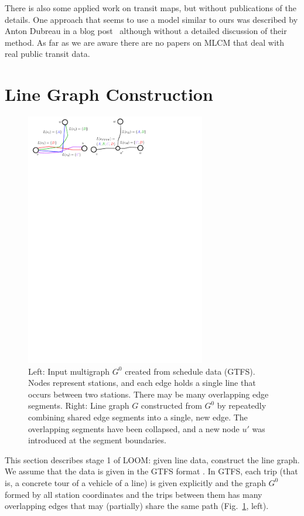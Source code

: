 \documentclass[format=acmsmall, review=false, screen=true]{acmart}
\begin{document}
There is also some applied work on transit maps, but without publications of the details.
One approach that seems to use a model similar to ours was described by Anton Dubreau in a blog post~\cite{dub16} although without a detailed discussion of their method. As far as we are aware there are no papers on MLCM that deal with real public transit data.

%
\section{Line Graph Construction}\label{SEC:graph}
%
\begin{figure}[t]
  \centering
  \includegraphics[width=0.7\textwidth]{linegraph.pdf}
  \caption{Left: Input multigraph $G^0$ created from schedule data (GTFS). Nodes represent stations, and each edge holds a single line that occurs between two stations. There may be many overlapping edge segments. Right: Line graph $G$ constructed from $G^0$ by repeatedly combining shared edge segments into a single, new edge. The overlapping segments have been collapsed, and a new node $u'$ was introduced at the segment boundaries.}  
  \label{FIG:linegraph}
\end{figure}

This section describes stage 1 of LOOM: given line data, construct the line graph.
We assume that the data is given in the GTFS format \cite{gtfs}.
In GTFS, each trip (that is, a concrete tour of a vehicle of a line) is given explicitly and the graph $G^0$ formed by all station coordinates and the trips between them has many overlapping edges that may (partially) share the same path (Fig.~\ref{FIG:linegraph}, left).
\end{document}
